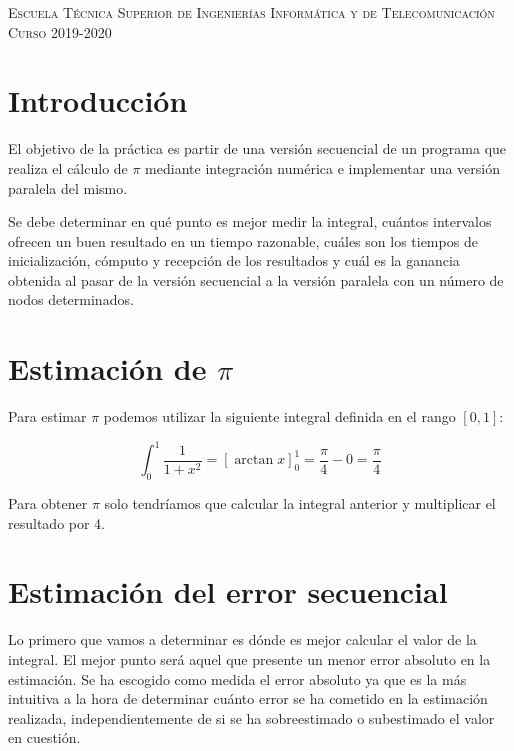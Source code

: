 \documentclass[11pt,a4paper]{article}
\begin{document}
\begin{titlepage}
\begin{minipage}{\textwidth}
\vspace{0.7cm}
\textsc{Escuela Técnica Superior de Ingenierías Informática y de Telecomunicación}\\
\vspace{1cm}
\textsc{Curso 2019-2020}
\end{minipage}
\end{titlepage}

\tableofcontents
\thispagestyle{empty}				%

\newpage

\setlength{\parskip}{1em}

\newpage

\section{Introducción}

El objetivo de la práctica es partir de una versión secuencial de un programa que realiza
el cálculo de $\pi$ mediante integración numérica e implementar una versión paralela
del mismo.

Se debe determinar en qué punto es mejor medir la integral, cuántos intervalos
ofrecen un buen resultado en un tiempo razonable, cuáles son los tiempos de inicialización,
cómputo y recepción de los resultados y cuál es la ganancia obtenida al pasar de la versión
secuencial a la versión paralela con un número de nodos determinados.

\section{Estimación de $\pi$}

Para estimar $\pi$ podemos utilizar la siguiente integral definida en el rango $[0, 1]$:

\begin{equation}
\int_0^1 \frac{1}{1 + x^2} = \left[ \arctan x \right]_0^1 = \frac{\pi}{4} - 0 = \frac{\pi}{4}
\end{equation}

Para obtener $\pi$ solo tendríamos que calcular la integral anterior y multiplicar el resultado
por 4.

\section{Estimación del error secuencial}

Lo primero que vamos a determinar es dónde es mejor calcular el valor de la integral. El mejor
punto será aquel que presente un menor error absoluto en la estimación. Se ha escogido como medida
el error absoluto ya que es la más intuitiva a la hora de determinar cuánto error se ha cometido
en la estimación realizada, independientemente de si se ha sobreestimado o subestimado el valor en
cuestión.
\end{document}
